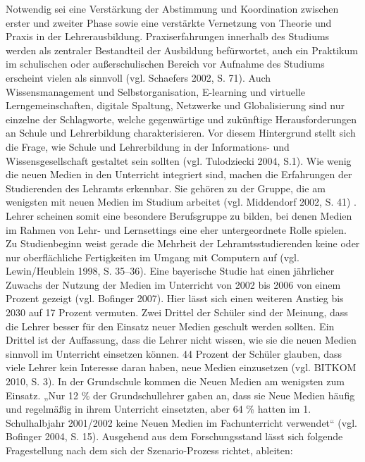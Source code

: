 \documentclass[12pt,a4paper]{article}
\begin{document}
Notwendig sei eine Verstärkung der Abstimmung und Koordination zwischen erster und zweiter Phase sowie eine verstärkte Vernetzung von Theorie und Praxis in der Lehrerausbildung. Praxiserfahrungen innerhalb des Studiums werden als zentraler Bestandteil der Ausbildung befürwortet, auch ein Praktikum im schulischen oder außerschulischen Bereich vor Aufnahme des Studiums erscheint vielen als sinnvoll (vgl. Schaefers 2002, S. 71). Auch Wissensmanagement und Selbstorganisation, E-learning und virtuelle Lerngemeinschaften, digitale Spaltung, Netzwerke und Globalisierung sind nur einzelne der Schlagworte, welche gegenwärtige und zukünftige Herausforderungen an Schule und Lehrerbildung charakterisieren. Vor diesem Hintergrund stellt sich die Frage, wie Schule und Lehrerbildung in der Informations- und Wissensgesellschaft gestaltet sein sollten (vgl. Tulodziecki 2004, S.1)\cite{Tulodziecki2004}. 
Wie wenig die neuen Medien in den Unterricht integriert sind, machen die Erfahrungen der Studierenden des Lehramts erkennbar. Sie gehören zu der Gruppe, die am wenigsten mit neuen Medien im Studium arbeitet (vgl. Middendorf 2002, S. 41) \cite{Middendorf2002}. Lehrer scheinen somit eine besondere Berufsgruppe zu bilden, bei denen Medien im Rahmen von Lehr- und Lernsettings eine eher untergeordnete Rolle spielen. Zu Studienbeginn weist gerade die Mehrheit der Lehramtsstudierenden keine oder nur oberflächliche Fertigkeiten im Umgang mit Computern auf (vgl. Lewin/Heublein 1998, S. 35–36)\cite{Karl1998}.
Eine bayerische Studie hat einen jährlicher Zuwachs der Nutzung der Medien im Unterricht von 2002 bis 2006 von einem Prozent gezeigt (vgl. Bofinger 2007)\cite{Bericht2007}. Hier lässt sich einen weiteren Anstieg bis 2030 auf 17 Prozent vermuten. 
Zwei Drittel der Schüler sind der Meinung, dass die Lehrer besser für den Einsatz neuer Medien geschult werden sollten. Ein Drittel ist der Auffassung, dass die Lehrer nicht wissen, wie sie die neuen Medien sinnvoll im Unterricht einsetzen können. 44 Prozent der Schüler glauben, dass viele Lehrer kein Interesse daran haben, neue Medien einzusetzen (vgl. BITKOM 2010, S. 3)\cite{BITKOM2010}. 
In der Grundschule kommen die Neuen Medien am wenigsten zum Einsatz. „Nur 12 \% der Grundschullehrer gaben an, dass sie Neue Medien häufig und regelmäßig in ihrem Unterricht einsetzten, aber 64 \% hatten im 1. Schulhalbjahr 2001/2002 keine Neuen Medien im Fachunterricht verwendet“ (vgl. Bofinger 2004, S. 15)\cite{Bofinger2004}.
Ausgehend aus dem Forschungsstand lässt sich folgende Fragestellung nach dem sich der Szenario-Prozess richtet, ableiten:
\end{document}
